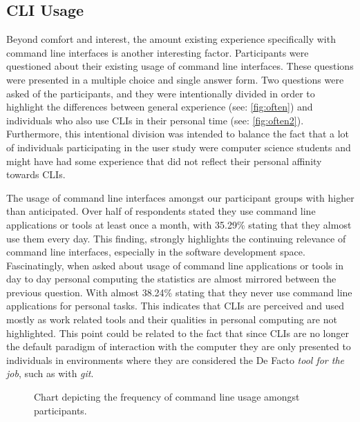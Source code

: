 \FloatBarrier %

\subsection{CLI Usage}

Beyond comfort and interest, the amount existing experience specifically with
command line interfaces is another interesting factor. Participants were
questioned about their existing usage of command line interfaces. These
questions were presented in a multiple choice and single answer form. Two
questions were asked of the participants, and they were intentionally divided
in order to highlight the differences between general experience  (see:
\autoref{fig:often}) and individuals who also use CLIs in their personal time
(see: \autoref{fig:often2}). Furthermore, this intentional division was
intended to balance the fact that a lot of individuals participating in the
user study were computer science students and might have had some experience
that did not reflect their personal affinity towards CLIs.

The usage of command line interfaces amongst our participant groups with higher
than anticipated. Over half of respondents stated they use command line
applications or tools at least once a month, with 35.29\% stating that they
almost use them every day. This finding, strongly highlights the continuing
relevance of command line interfaces, especially in the software development
space. Fascinatingly, when asked about usage of command line applications or
tools in day to day personal computing the statistics are almost mirrored
between the previous question. With almost 38.24\% stating that they never use
command line applications for personal tasks. This indicates that CLIs are
perceived and used mostly as work related tools and their qualities in
personal computing are not highlighted. This point could be related to the fact
that since CLIs are no longer the default paradigm of interaction with the
computer they are only presented to individuals in environments where they are
considered the De Facto \textit{tool  for the job}, such as with
\textit{git}\cite{hultstrand2015git}.

\begin{figure}[htbp]
	\centering
	\scalebox{0.67}{}
	\caption{Chart depicting the frequency of command line usage amongst participants.}
	\label{fig:often}
\end{figure}

